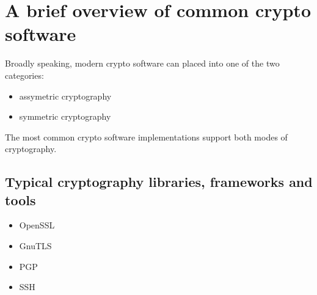 \section{A brief overview of common crypto software}

Broadly speaking, modern crypto software can placed into one of the two categories:

\begin{itemize}
\item assymetric cryptography 
\item symmetric cryptography
\end{itemize}

The most common crypto software implementations support both modes of cryptography. 

\subsection{Typical cryptography libraries, frameworks and tools}

\begin{itemize}
\item OpenSSL
\item GnuTLS
\item PGP
\item SSH
\end{itemize}





